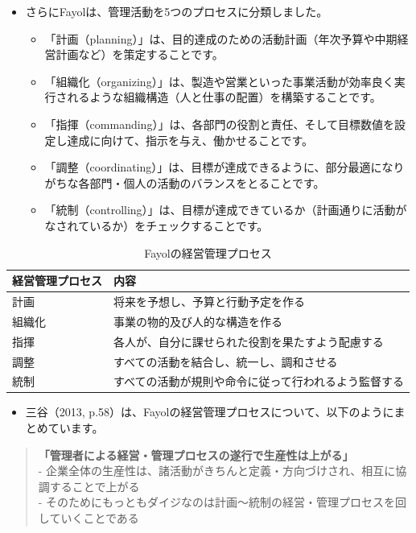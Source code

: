 \documentclass[
]{book}
\providecommand{\tightlist}{%
  \setlength{\itemsep}{0pt}\setlength{\parskip}{0pt}}
\begin{document}
\begin{itemize}
\item
  さらにFayolは、管理活動を5つのプロセスに分類しました。

  \begin{itemize}
  \item
    「計画（planning）」は、目的達成のための活動計画（年次予算や中期経営計画など）を策定することです。
  \item
    「組織化（organizing）」は、製造や営業といった事業活動が効率良く実行されるような組織構造（人と仕事の配置）を構築することです。
  \item
    「指揮（commanding）」は、各部門の役割と責任、そして目標数値を設定し達成に向けて、指示を与え、働かせることです。
  \item
    「調整（coordinating）」は、目標が達成できるように、部分最適になりがちな各部門・個人の活動のバランスをとることです。
  \item
    「統制（controlling）」は、目標が達成できているか（計画通りに活動がなされているか）をチェックすることです。
  \end{itemize}
\end{itemize}

\begin{table}

\caption{\label{tab:fayolb}Fayolの経営管理プロセス}
\centering
\begin{tabular}[t]{l|l}
\hline
経営管理プロセス & 内容\\
\hline
計画 & 将来を予想し、予算と行動予定を作る\\
\hline
組織化 & 事業の物的及び人的な構造を作る\\
\hline
指揮 & 各人が、自分に課せられた役割を果たすよう配慮する\\
\hline
調整 & すべての活動を結合し、統一し、調和させる\\
\hline
統制 & すべての活動が規則や命令に従って行われるよう監督する\\
\hline
\end{tabular}
\end{table}

\begin{itemize}
\tightlist
\item
  三谷（2013, p.58）は、Fayolの経営管理プロセスについて、以下のようにまとめています。
\end{itemize}

\begin{quote}
\textbf{「管理者による経営・管理プロセスの遂行で生産性は上がる」}\\
- 企業全体の生産性は、諸活動がきちんと定義・方向づけされ、相互に協調することで上がる\\
- そのためにもっともダイジなのは計画～統制の経営・管理プロセスを回していくことである
\end{quote}
\end{document}
